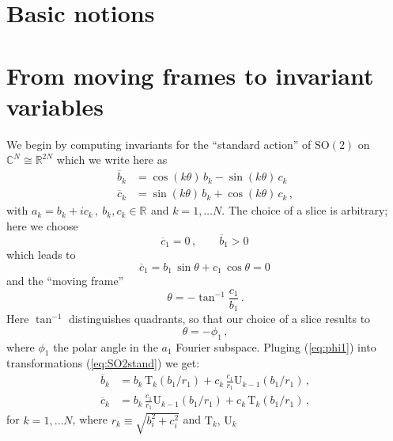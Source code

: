 \documentclass[aip,cha,showpacs,twocolumn,
 		  reprint]{revtex4-1} %
\newcommand{\beq}{\begin{equation}}
\newcommand{\eeq}{\end{equation}}
\newcommand{\bseq}{\begin{subequations}}
\newcommand{\eseq}{\end{subequations}}
\newcommand{\barr}{\begin{array}}
\newcommand{\earr}{\end{array}}
\newcommand{\refeq}  [1] {(\ref{#1})}
\newcommand{\Rls}[1]{\ensuremath{\mathbb{R}^{#1}}}
\newcommand{\Clx}[1]{\ensuremath{\mathbb{C}^{#1}}}
\newcommand{\SOn}[1]{\ensuremath{\textrm{SO}(#1)}}         %
\newcommand{\chebT}{\mathrm{T}}
\newcommand{\chebU}{\mathrm{U}}
\begin{document}
\section{Basic notions\label{s:notions}}

\section{From moving frames to invariant variables}

We begin by computing invariants for the ``standard action''
of $\SOn{2}$ on $\Clx{N}\cong\Rls{2N}$
which we write here as
\bseq\label{eq:SO2stand}
  \begin{align}
	  \overline{b}_k &= \cos(k\theta)\,b_k - \sin(k\theta)\,c_k\,\label{eq:SO2stand1}\\
	  \overline{c}_k &= \sin(k\theta)\,b_k + \cos(k\theta)\,c_k\,,\label{eq:SO2stand2}
  \end{align}
\eseq
with $a_k=b_k+i c_k\,,\ b_k,c_k\in\Rls{}$ and $k=1,\ldots N$.
The choice of a slice is arbitrary; here we choose
\beq
 	\overline{c}_1=0\,,\qquad \overline{b}_1>0\,
\eeq
which leads to
\beq
	\overline{c}_1 = b_1\,\sin\theta + c_1\,\cos\theta  = 0\,
	\label{eq:SO2norm}
\eeq
and the ``moving frame''
\beq
	\theta=-\tan^{-1}\frac{c_1}{b_1}\,.
	\label{eq:SO2mf}
\eeq
Here $\tan^{-1}$ distinguishes quadrants, so that our choice of a slice
results to
\beq\label{eq:phi1}
  \theta=-\phi_1\,,
\eeq
where $\phi_1$ the polar angle in the $a_1$ Fourier
subspace. Pluging \refeq{eq:phi1} into
transformations \refeq{eq:SO2stand} we get:
\bseq\label{eq:SO2cheb}
  \begin{align}
    \overline{b}_k &=
		    b_k\, \chebT_k\left(b_1/r_1\right)+
		    c_k\,\frac{c_1}{r_1} \chebU_{k-1}\left(b_1/r_1\right)\,, \label{eq:SO2cheb1}\\
    \overline{c}_k &=
		    b_k\, \frac{c_1}{r_1} \chebU_{k-1}\left(b_1/r_1\right)+
		    c_k\,\chebT_k\left(b_1/r_1\right)\,,  \label{eq:SO2cheb2}
  \end{align}
\eseq
for $k=1,\ldots N$, where $r_k\equiv\sqrt{b_i^2+c_i^2}$ and $\chebT_k,\,\chebU_k$
\end{document}

